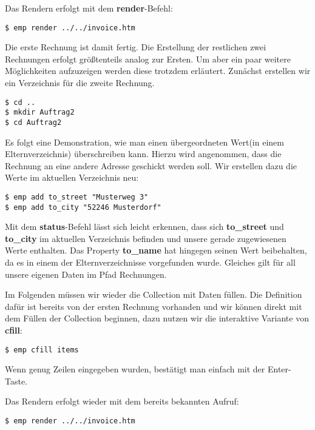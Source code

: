 Das Rendern erfolgt mit dem \textbf{render}-Befehl:
\begin{lstlisting}[style=Bash]
$ emp render ../../invoice.htm
\end{lstlisting}

Die erste Rechnung ist damit fertig. Die Erstellung der restlichen zwei Rechnungen erfolgt größtenteils analog zur Ersten. Um aber ein paar weitere Möglichkeiten aufzuzeigen werden diese trotzdem erläutert.
Zunächst erstellen wir ein Verzeichnis für die zweite Rechnung.

\begin{lstlisting}[style=Bash]
$ cd ..
$ mkdir Auftrag2
$ cd Auftrag2
\end{lstlisting}

Es folgt eine Demonstration, wie man einen übergeordneten Wert(in einem Elternverzeichnis) überschreiben kann. Hierzu wird angenommen, dass die Rechnung an eine andere Adresse geschickt werden soll. Wir erstellen dazu die Werte im aktuellen Verzeichnis neu:

\begin{lstlisting}[style=Bash]
$ emp add to_street "Musterweg 3"
$ emp add to_city "52246 Musterdorf"
\end{lstlisting}

Mit dem \textbf{status}-Befehl lässt sich leicht erkennen, dass sich \textbf{to\_street} und \textbf{to\_city} im aktuellen Verzeichnis befinden und unsere gerade zugewiesenen Werte enthalten.
Das Property \textbf{to\_name} hat hingegen seinen Wert beibehalten, da es in einem der Elternverzeichnisse vorgefunden wurde. Gleiches gilt für all unsere eigenen Daten im Pfad Rechnungen.

\vspace{0.5em}
Im Folgenden müssen wir wieder die Collection mit Daten füllen. Die Definition dafür ist bereits von der ersten Rechnung vorhanden und wir können direkt mit dem Füllen der Collection beginnen, dazu nutzen wir die interaktive Variante von \textbf{cfill}:
\begin{lstlisting}[style=Bash]
$ emp cfill items
\end{lstlisting}
Wenn genug Zeilen eingegeben wurden, bestätigt man einfach mit der Enter-Taste.

Das Rendern erfolgt wieder mit dem bereits bekannten Aufruf:
\begin{lstlisting}[style=Bash]
$ emp render ../../invoice.htm
\end{lstlisting}
